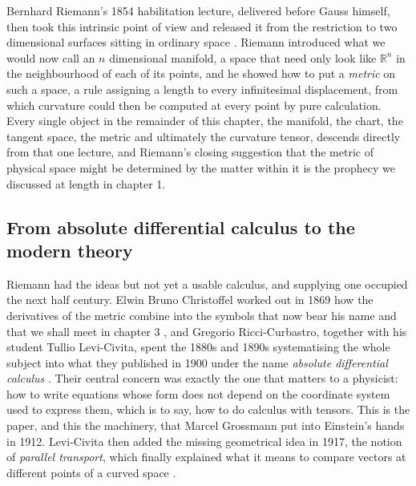         Bernhard Riemann's 1854 habilitation lecture, delivered before Gauss himself, then took this intrinsic point of view and released it from the restriction to two dimensional surfaces sitting in ordinary space \citep{riemann1873}. Riemann introduced what we would now call an $n$ dimensional manifold, a space that need only look like $\mathbb{R}^n$ in the neighbourhood of each of its points, and he showed how to put a \textit{metric} on such a space, a rule assigning a length to every infinitesimal displacement, from which curvature could then be computed at every point by pure calculation. Every single object in the remainder of this chapter, the manifold, the chart, the tangent space, the metric and ultimately the curvature tensor, descends directly from that one lecture, and Riemann's closing suggestion that the metric of physical space might be determined by the matter within it is the prophecy we discussed at length in chapter 1.

    \subsection{From absolute differential calculus to the modern theory}

        Riemann had the ideas but not yet a usable calculus, and supplying one occupied the next half century. Elwin Bruno Christoffel worked out in 1869 how the derivatives of the metric combine into the symbols that now bear his name and that we shall meet in chapter 3 \citep{christoffel1869}, and Gregorio Ricci-Curbastro, together with his student Tullio Levi-Civita, spent the 1880s and 1890s systematising the whole subject into what they published in 1900 under the name \textit{absolute differential calculus} \citep{ricci1900}. Their central concern was exactly the one that matters to a physicist: how to write equations whose form does not depend on the coordinate system used to express them, which is to say, how to do calculus with tensors. This is the paper, and this the machinery, that Marcel Grossmann put into Einstein's hands in 1912. Levi-Civita then added the missing geometrical idea in 1917, the notion of \textit{parallel transport}, which finally explained what it means to compare vectors at different points of a curved space \citep{levicivita1917}.

